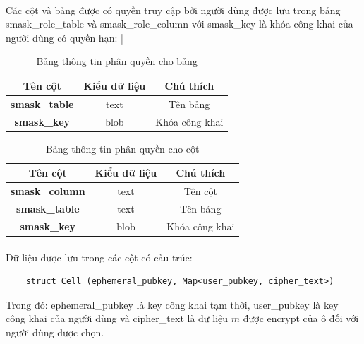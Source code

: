 \paragraph{}
Các cột và bảng được có quyền truy cập bởi người dùng được lưu trong bảng smask\_role\_table và smask\_role\_column với smask\_key là khóa công khai của người dùng có quyền hạn:
|
\begin{table}[h]
	\centering
	\caption{Bảng thông tin phân quyền cho bảng}
	\begin{tabular}{|c|c|c|}
		\hline
		\textbf{Tên cột} & \textbf{Kiểu dữ liệu} & \textbf{Chú thích} \\
		\hline
		\textbf{smask\_table} & text & Tên bảng\\
		\hline
		\textbf{smask\_key} & blob & Khóa công khai \\
		\hline
	\end{tabular}
\end{table}

\begin{table}[h]
	\centering
	\caption{Bảng thông tin phân quyền cho cột}
	\begin{tabular}{|c|c|c|}
		\hline
		\textbf{Tên cột} & \textbf{Kiểu dữ liệu} & \textbf{Chú thích} \\
		\hline
		\textbf{smask\_column} & text & Tên cột\\
		\hline
		\textbf{smask\_table} & text & Tên bảng\\
		\hline
		\textbf{smask\_key} & blob & Khóa công khai \\
		\hline
	\end{tabular}
\end{table}

\paragraph{}
Dữ liệu được lưu trong các cột có cấu trúc: 

\begin{verbatim}
	struct Cell (ephemeral_pubkey, Map<user_pubkey, cipher_text>)
\end{verbatim}
Trong đó: ephemeral\_pubkey là \gls{key} công khai tạm thời, user\_pubkey là \gls{key} công khai của người dùng và cipher\_text là dữ liệu $m$ được \gls{encrypt} của ô đối với người dùng được chọn. 